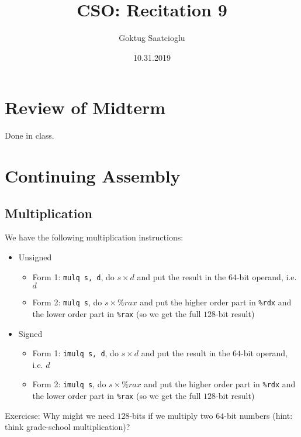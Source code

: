 \documentclass [10pt]{article}
\begin{document}
\title{\vspace{-2cm}CSO: Recitation 9}
\author{Goktug Saatcioglu}
\date{10.31.2019}
\maketitle

\section{Review of Midterm}
Done in class.

\section{Continuing Assembly}

\subsection{Multiplication}
We have the following multiplication instructions:
\begin{itemize}
  \item Unsigned
  \begin{itemize}
    \item Form 1: \verb|mulq s, d|, do $s\times d$ and put the result in the $64$-bit operand, i.e. $d$
    \item Form 2: \verb|mulq s|, do $s\times \%rax$ and put the higher order part in \verb|%rdx| and the lower order part in \verb|%rax| (so we get the full $128$-bit result)
  \end{itemize}
  \item Signed
  \begin{itemize}
    \item Form 1: \verb|imulq s, d|, do $s\times d$ and put the result in the $64$-bit operand, i.e. $d$
    \item Form 2: \verb|imulq s|, do $s\times \%rax$ and put the higher order part in \verb|%rdx| and the lower order part in \verb|%rax| (so we get the full $128$-bit result)
  \end{itemize}
\end{itemize}
Exercicse: Why might we need $128$-bits if we multiply two $64$-bit numbers (hint: think grade-school multiplication)?
\end{document}
